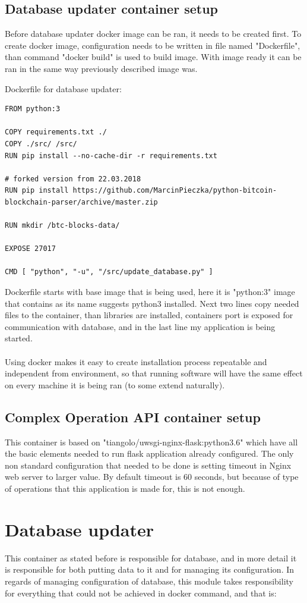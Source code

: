 \documentclass[12pt, en, eng, oneside]{mgr}
\begin{document}
\subsection{Database updater container setup}
Before database updater docker image can be ran, it needs to be created first. To create docker image, configuration needs to be written in file named "Dockerfile", than command "docker build" is used to build image. With image ready it can be ran in the same way previously described image was.

Dockerfile for database updater:
\begin{verbatim}
FROM python:3

COPY requirements.txt ./
COPY ./src/ /src/
RUN pip install --no-cache-dir -r requirements.txt

# forked version from 22.03.2018
RUN pip install https://github.com/MarcinPieczka/python-bitcoin-blockchain-parser/archive/master.zip

RUN mkdir /btc-blocks-data/

EXPOSE 27017

CMD [ "python", "-u", "/src/update_database.py" ]
\end{verbatim}

Dockerfile starts with base image that is being used, here it is "python:3" image that contains as its name suggests python3 installed.
Next two lines copy needed files to the container, than libraries are installed, containers port is exposed for communication with database, and in the last line my application is being started.
\\
\\
Using docker makes it easy to create installation process repeatable and independent from environment, so that running software will have the same effect on every machine it is being ran (to some extend naturally). 

\subsection{Complex Operation API container setup}
This container is based on "tiangolo/uwsgi-nginx-flask:python3.6" which have all the basic elements needed to run flask application already configured. The only non standard configuration that needed to be done is setting timeout in Nginx web server to larger value. By default timeout is 60 seconds, but because of type of operations that this application is made for, this is not enough.  

\section{Database updater}
This container as stated before is responsible for database, and in more detail it is responsible for both putting data to it and for managing its configuration. In regards of managing configuration of database, this module takes responsibility for everything that could not be achieved in docker command, and that is:
\end{document}
